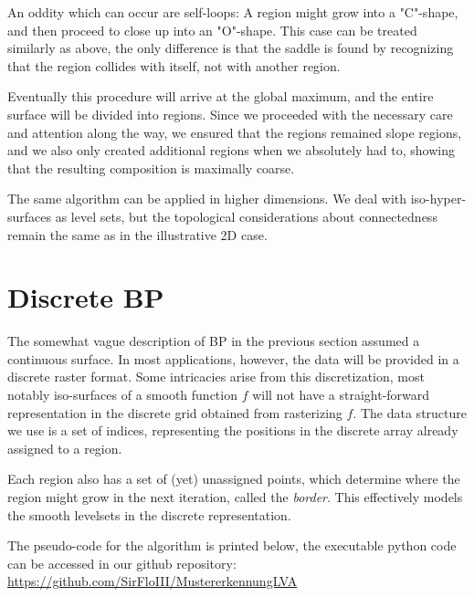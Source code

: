 \documentclass[a4paper,10pt,notitlepage,fullpage]{paper}
\theoremstyle{plain}
\theoremstyle{definition}
\begin{document}
An oddity which can occur are self-loops: A region might grow into a "C"-shape, and then proceed to close up into an "O"-shape.
This case can be treated similarly as above, the only difference is that the saddle is found by recognizing that the region collides with itself, not with another region.

Eventually this procedure will arrive at the global maximum, and the entire surface will be divided into regions.
Since we proceeded with the necessary care and attention along the way, we ensured that the regions remained slope regions, and we also only created additional regions when we absolutely had to, showing that the resulting composition is maximally coarse.

The same algorithm can be applied in higher dimensions.
We deal with iso-hyper-surfaces as level sets, but the topological considerations about connectedness remain the same as in the illustrative 2D case.

\section{Discrete BP}
\label{sec:details}

The somewhat vague description of BP in the previous section assumed a continuous surface.
In most applications, however, the data will be provided in a discrete raster format.
Some intricacies arise from this discretization, most notably iso-surfaces of a smooth function $f$ will not have a straight-forward representation in the discrete grid obtained from rasterizing $f$.
The data structure we use is a set of indices, representing the positions in the discrete array already assigned to a region.

Each region also has a set of (yet) unassigned points, which determine where the region might grow in the next iteration, called the \emph{border}.
This effectively models the smooth levelsets in the discrete representation.

The pseudo-code for the algorithm is printed below, the executable python code can be accessed in our github repository:
\url{https://github.com/SirFloIII/MustererkennungLVA}
\end{document}
